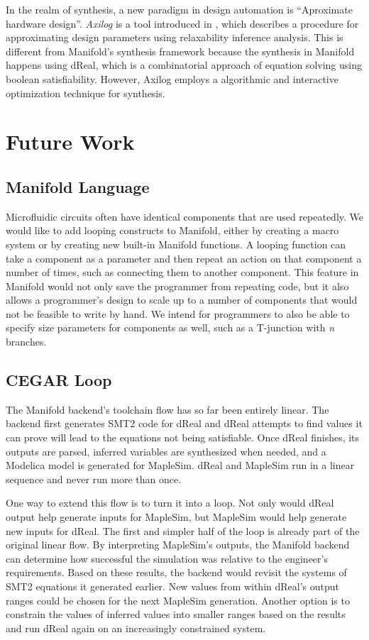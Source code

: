 In the realm of synthesis, a new paradigm in design automation is ``Aproximate hardware design''.
\emph{Axilog} is a tool introduced in  \cite{axilog}, which describes a procedure for approximating design parameters using relaxability inference analysis.
This is different from Manifold's synthesis framework because the synthesis in Manifold happens using dReal, which is a combinatorial approach of equation solving using boolean satisfiability.
However, Axilog employs a algorithmic and interactive optimization technique for synthesis.

\section{Future Work}

\subsection{Manifold Language}

Microfluidic circuits often have identical components that are used repeatedly.
We would like to add looping constructs to Manifold, either by creating a
macro system or by creating new built-in Manifold functions. A looping function
can take a component as a parameter and then repeat an action on that
component a number of times, such as connecting them to another component.
This feature in Manifold would not only save the programmer from repeating
code, but it also allows a programmer's design to scale up to a number of
components that would not be feasible to write by hand. We intend for
programmers to also be able to specify size parameters for components as
well, such as a T-junction with \emph{n} branches.

\subsection{CEGAR Loop}

The Manifold backend's toolchain flow has so far been entirely linear.
The backend first generates SMT2 code for dReal and dReal attempts to find values it can prove will lead to the equations not being satisfiable.
Once dReal finishes, its outputs are parsed, inferred variables are synthesized when needed, and a Modelica model is generated for MapleSim.
dReal and MapleSim run in a linear sequence and never run more than once.

One way to extend this flow is to turn it into a loop.
Not only would dReal output help generate inputs for MapleSim, but MapleSim would help generate new inputs for dReal.
The first and simpler half of the loop is already part of the original linear flow.
By interpreting MapleSim's outputs, the Manifold backend can determine how successful the simulation was relative to the engineer's requirements.
Based on these results, the backend would revisit the systems of SMT2 equations it generated earlier.
New values from within dReal's output ranges could be chosen for the next MapleSim generation.
Another option is to constrain the values of inferred values into smaller ranges based on the results and run dReal again on an increasingly constrained system.


